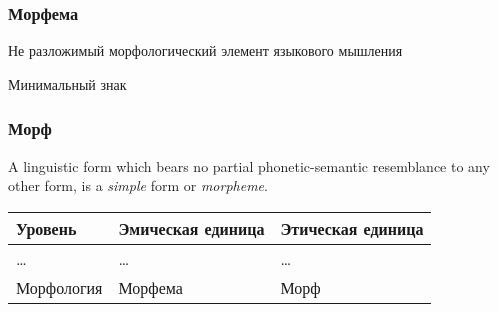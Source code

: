 \begin{frame}
    \frametitle{Морфема}

    \begin{exampleblock}{\autocite[290--291]{baudouin:1963}}
        Не разложимый морфологический элемент языкового мышления
    \end{exampleblock}

    \begin{exampleblock}{\autocite{les}}
        Минимальный знак
    \end{exampleblock}

\end{frame}

\begin{frame}
    \frametitle{Морф}

    \begin{exampleblock}{\autocite[161]{bloomfield:1973}}
        A linguistic form which bears no partial phonetic-semantic resemblance to any other form, is a \textit{simple} form or \textit{morpheme}.
    \end{exampleblock}

    \begin{table}
        \begin{tabularx}{\textwidth}{XXX}
            Уровень & Эмическая единица & Этическая единица \\ \midrule \midrule
            \ldots & \ldots & \ldots \\ \midrule
            Морфология & Морфема & Морф \\
        \end{tabularx}
    \end{table}

    \begin{columns}
        \begin{center}
             
        \end{center}

   \end{columns}
\end{frame}

